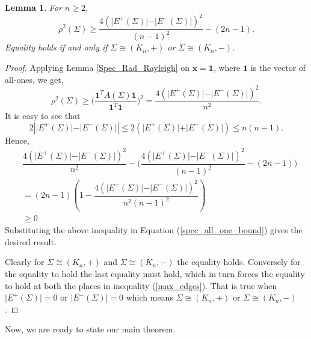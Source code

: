 \documentclass[12pt]{article}
\theoremstyle{plain}
\newtheorem{lemma}[theorem]{Lemma}
\numberwithin{equation}{section}
\begin{document}
	\begin{lemma}\label{Spec_Rad_lower}
		For $n \geq 2$,
		\[\rho^2(\Sigma)\geq \dfrac{4(\vert E^+(\Sigma)\vert-\vert E^-(\Sigma)\vert)^2}{(n-1)^2}-(2n-1).\]
		Equality holds if and only if $\Sigma\cong(K_n,+)$ or $\Sigma \cong(K_n,-)$.
	\end{lemma}
	\begin{proof}
		Applying Lemma \ref{Spec_Rad_Rayleigh} on $\mathbf{x}=\mathbf{1}$, where $\mathbf{1}$ is the vector of all-ones,  we get,      \begin{equation}\label{spec_all_one_bound} 
			\rho^2(\Sigma)\geq \bigg(\dfrac{\textbf{1}^TA(\Sigma)\textbf{1}}{\textbf{1}^{T}\textbf{1}}\bigg)^2=\dfrac{4(\vert E^+(\Sigma)\vert-\vert E^-(\Sigma)\vert)^2}{n^2}.
		\end{equation} 
		It is easy to see that 
		\begin{equation}\label{max_edges}
			2\left\vert \vert E^+(\Sigma)\vert-\vert E^-(\Sigma)\vert\right\vert\leq 2(\vert E^+(\Sigma)\vert+\vert E^-(\Sigma)\vert)\leq n(n-1).
		\end{equation}
		Hence,
		\begin{align*}
			&\dfrac{4(\vert E^+(\Sigma)\vert-\vert E^-(\Sigma)\vert)^2}{n^2}-\Bigg(\dfrac{4(\vert E^+(\Sigma)\vert-\vert E^-(\Sigma)\vert)^2}{(n-1)^2}-(2n-1)\Bigg)\\
			&=(2n-1)\left(1-\dfrac{4\left(\vert E^+(\Sigma)\vert-\vert E^-(\Sigma)\vert\right)^2}{n^2(n-1)^2}\right)\\
			&\geq 0
		\end{align*}
		Substituting the above inequality in Equation (\ref{spec_all_one_bound}) gives the desired result.
		
		Clearly for $\Sigma\cong(K_n,+)$ and $\Sigma\cong(K_n,-)$ the equality holds. Conversely for the equality to hold the last equality must hold, which in turn forces the equality to hold at both the places in inequality (\ref{max_edges}). That is true when $\vert E^+(\Sigma)\vert=0$ or $\vert E^-(\Sigma)\vert=0$ which means $\Sigma\cong(K_n,+)$ or $\Sigma \cong(K_n,-)$.
	\end{proof}
	
	Now, we are ready to state our main theorem.
	
\end{document}
